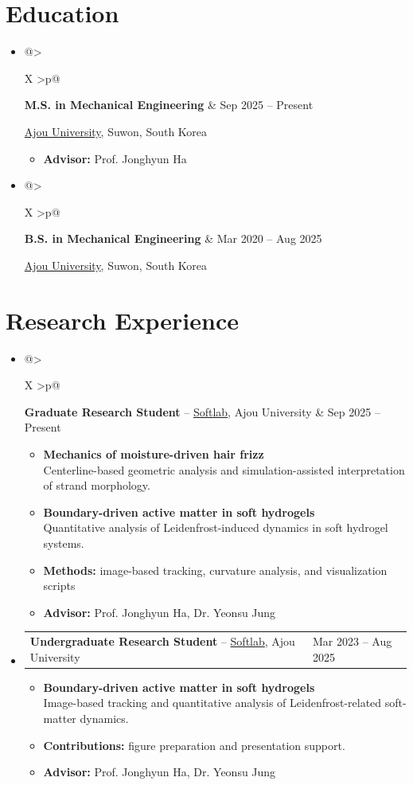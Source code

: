 \documentclass[a4paper,10pt]{article}
\makeatletter
\newcommand{\cvdate}[1]{\hfill \textcolor{textmain}{#1}}
\newcommand{\cvline}[1]{\parbox[t]{\cvdetailwidth}{#1}\par\vspace{-1pt}}
\newcommand{\cvfield}[2]{\textbf{#1:} #2}
\newcommand{\cvitemtitle}[2]{\textbf{\textcolor{textmain}{#1}}\cvdate{#2}}
\newlength{\cvdatewidth}
\newlength{\cvdetailwidth}
\newcommand{\cventryhead}[3]{%
  \begin{tabularx}{\linewidth}{@{}>{\raggedright\arraybackslash}X >{\raggedleft\arraybackslash}p{\cvdatewidth}@{}}
    \textbf{\textcolor{textmain}{#1}} \textcolor{muted}{--} #3 & \textcolor{textmain}{#2}
  \end{tabularx}\par\vspace{-1pt}
}
\renewcommand{\cvitemtitle}[2]{%
  \begin{tabularx}{\linewidth}{@{}>{\raggedright\arraybackslash}X >{\raggedleft\arraybackslash}p{\cvdatewidth}@{}}
    \textbf{\textcolor{textmain}{#1}} & \textcolor{textmain}{#2}
  \end{tabularx}\par\vspace{-1pt}
}
\newenvironment{cvdetailblock}
  {\begin{minipage}{\cvdetailwidth}\raggedright\begin{itemize}}
  {\end{itemize}\end{minipage}}
\newcommand{\researchtopic}[2]{%
  \item \textbf{#1}\\[-1pt]
  \textcolor{muted}{#2}
}
\makeatother
\begin{document}
\section*{Education}
\begin{itemize}
  \item \cvitemtitle{M.S. in Mechanical Engineering}{Sep 2025 -- Present}
  \cvline{\href{https://www.ajou.ac.kr/en/index.do}{Ajou University}, Suwon, South Korea}
  \begin{cvdetailblock}
    \item \cvfield{Advisor}{Prof. Jonghyun Ha}
  \end{cvdetailblock}

  \item \cvitemtitle{B.S. in Mechanical Engineering}{Mar 2020 -- Aug 2025}
  \cvline{\href{https://www.ajou.ac.kr/en/index.do}{Ajou University}, Suwon, South Korea}
\end{itemize}

\section*{Research Experience}
\begin{itemize}
  \item \cventryhead{Graduate Research Student}{Sep 2025 -- Present}{\href{https://www.softlab.ajou.ac.kr/}{Softlab}, Ajou University}
  \begin{cvdetailblock}
    \researchtopic{Mechanics of moisture-driven hair frizz}{Centerline-based geometric analysis and simulation-assisted interpretation of strand morphology.}
    \researchtopic{Boundary-driven active matter in soft hydrogels}{Quantitative analysis of Leidenfrost-induced dynamics in soft hydrogel systems.}
    \item \cvfield{Methods}{image-based tracking, curvature analysis, and visualization scripts}
    \item \cvfield{Advisor}{Prof. Jonghyun Ha, Dr. Yeonsu Jung}
  \end{cvdetailblock}

  \item \cventryhead{Undergraduate Research Student}{Mar 2023 -- Aug 2025}{\href{https://www.softlab.ajou.ac.kr/}{Softlab}, Ajou University}
  \begin{cvdetailblock}
    \researchtopic{Boundary-driven active matter in soft hydrogels}{Image-based tracking and quantitative analysis of Leidenfrost-related soft-matter dynamics.}
    \item \cvfield{Contributions}{figure preparation and presentation support.}
    \item \cvfield{Advisor}{Prof. Jonghyun Ha, Dr. Yeonsu Jung}
  \end{cvdetailblock}
\end{itemize}
\end{document}

